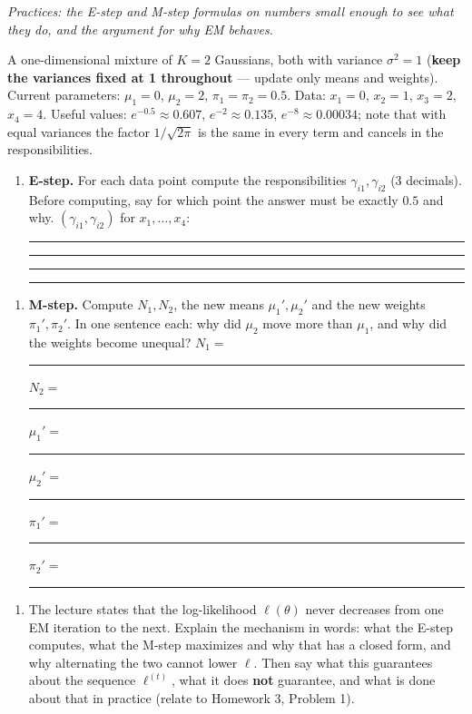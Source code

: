 \documentclass[
  11pt,
]{article}
\providecommand{\tightlist}{%
  \setlength{\itemsep}{0pt}\setlength{\parskip}{0pt}}
\newcommand{\answerspace}[1]{\par\vspace*{#1}}  %
\newcommand{\blank}[1][1.2in]{\rule{#1}{0.4pt}}
\begin{document}
\emph{Practices: the E-step and M-step formulas on numbers small enough
to see what they do, and the argument for why EM behaves.}

A one-dimensional mixture of \(K=2\) Gaussians, both with variance
\(\sigma^2 = 1\) (\textbf{keep the variances fixed at 1 throughout} ---
update only means and weights). Current parameters: \(\mu_1 = 0\),
\(\mu_2 = 2\), \(\pi_1 = \pi_2 = 0.5\). Data: \(x_1 = 0\), \(x_2 = 1\),
\(x_3 = 2\), \(x_4 = 4\). Useful values: \(e^{-0.5}\approx0.607\),
\(e^{-2}\approx0.135\), \(e^{-8}\approx0.00034\); note that with equal
variances the factor \(1/\sqrt{2\pi}\) is the same in every term and
cancels in the responsibilities.

\begin{enumerate}
\def\labelenumi{(\alph{enumi})}
\tightlist
\item
  \textbf{E-step.} For each data point compute the responsibilities
  \(\gamma_{i1}, \gamma_{i2}\) (3 decimals). Before computing, say for
  which point the answer must be exactly \(0.5\) and why.
  \((\gamma_{i1},\gamma_{i2})\) for \(x_1,\dots,x_4\):
  \blank[1in] \blank[1in] \blank[1in] \blank[1in]
\end{enumerate}

\answerspace{2.5in}

\begin{enumerate}
\def\labelenumi{(\alph{enumi})}
\setcounter{enumi}{1}
\tightlist
\item
  \textbf{M-step.} Compute \(N_1, N_2\), the new means
  \(\mu_1', \mu_2'\) and the new weights \(\pi_1', \pi_2'\). In one
  sentence each: why did \(\mu_2\) move more than \(\mu_1\), and why did
  the weights become unequal? \(N_1 =\) \blank[0.5in] \(N_2 =\)
  \blank[0.5in] \(\mu_1' =\) \blank[0.5in] \(\mu_2' =\)
  \blank[0.5in] \(\pi_1' =\) \blank[0.5in] \(\pi_2' =\) \blank[0.5in]
\end{enumerate}

\answerspace{3.4in}

\begin{enumerate}
\def\labelenumi{(\alph{enumi})}
\setcounter{enumi}{2}
\tightlist
\item
  The lecture states that the log-likelihood \(\ell(\theta)\) never
  decreases from one EM iteration to the next. Explain the mechanism in
  words: what the E-step computes, what the M-step maximizes and why
  that has a closed form, and why alternating the two cannot lower
  \(\ell\). Then say what this guarantees about the sequence
  \(\ell^{(t)}\), what it does \textbf{not} guarantee, and what is done
  about that in practice (relate to Homework 3, Problem 1).
\end{enumerate}
\end{document}

